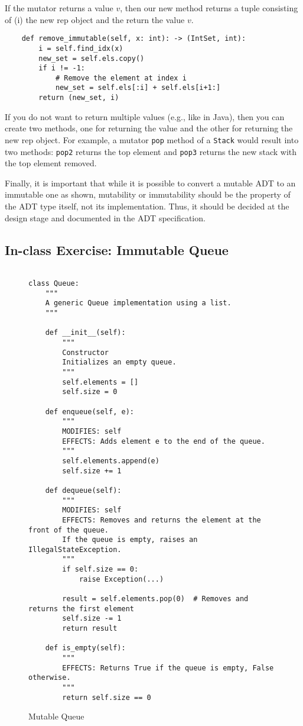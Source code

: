 \documentclass[oneside,11pt,dvipsnames]{book}
\newcommand{\code}[1]{\texttt{#1}}
\begin{document}
If the mutator returns a value $v$, then our new method returns a tuple consisting of (i) the new rep object and the return the value $v$. 
\begin{lstlisting}
    def remove_immutable(self, x: int): -> (IntSet, int):
        i = self.find_idx(x)
        new_set = self.els.copy()
        if i != -1:
            # Remove the element at index i
            new_set = self.els[:i] + self.els[i+1:]  
        return (new_set, i)
\end{lstlisting}

If you do not want to return multiple values (e.g., like in Java), then you can create two methods, one for returning the value and the other for returning the new rep object.
For example, a mutator \code{pop} method of a \code{Stack} would result into two methods: \code{pop2} returns the top element and \code{pop3} returns the new stack with the top element removed.

Finally, it is important that while it is possible to convert a mutable ADT to an immutable one as shown, mutability or immutability should be the property of the ADT type itself, not its implementation. Thus, it should be decided at the design stage and documented in the ADT specification.

\subsection{In-class Exercise: Immutable Queue}\label{ic:immutable-queue}


\begin{figure}
    \begin{lstlisting}

class Queue:
    """
    A generic Queue implementation using a list.
    """

    def __init__(self):
        """
        Constructor
        Initializes an empty queue.
        """
        self.elements = []
        self.size = 0

    def enqueue(self, e):
        """
        MODIFIES: self
        EFFECTS: Adds element e to the end of the queue.
        """
        self.elements.append(e)
        self.size += 1

    def dequeue(self):
        """
        MODIFIES: self
        EFFECTS: Removes and returns the element at the front of the queue.
        If the queue is empty, raises an IllegalStateException.
        """
        if self.size == 0:
            raise Exception(...)

        result = self.elements.pop(0)  # Removes and returns the first element
        self.size -= 1
        return result

    def is_empty(self):
        """
        EFFECTS: Returns True if the queue is empty, False otherwise.
        """
        return self.size == 0

    \end{lstlisting}
    \caption{Mutable Queue}\label{ex:mutable-queue}
\end{figure}
\end{document}
